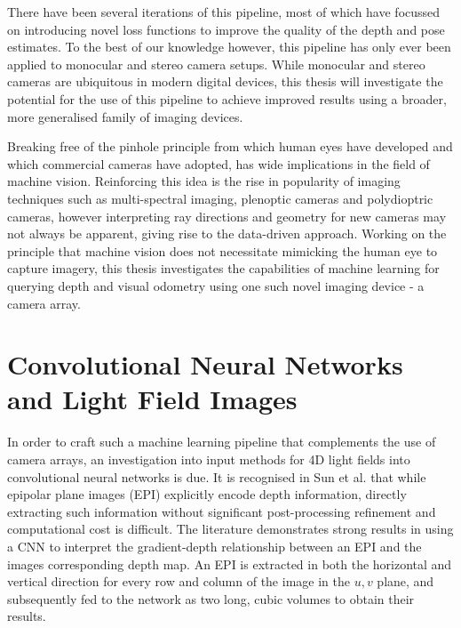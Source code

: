 \documentclass[openany]{book}
\begin{document}
There have been several iterations \cite{godard2016consistency, godard2018selfsupervised, zhan2018deepfeature} of this pipeline, most of which have focussed on introducing novel loss functions to improve the quality of the depth and pose estimates. To the best of our knowledge however, this pipeline has only ever been applied to monocular and stereo camera setups. While monocular and stereo cameras are ubiquitous in modern digital devices, this thesis will investigate the potential for the use of this pipeline to achieve improved results using a broader, more generalised family of imaging devices. 

Breaking free of the pinhole principle from which human eyes have developed and which commercial cameras have adopted, has wide implications in the field of machine vision. Reinforcing this idea is the rise in popularity of imaging techniques such as multi-spectral imaging, plenoptic cameras and polydioptric cameras, however interpreting ray directions and geometry for new cameras may not always be apparent, giving rise to the data-driven approach. Working on the principle that machine vision does not necessitate mimicking the human eye to capture imagery, this thesis investigates the capabilities of machine learning for querying depth and visual odometry using one such novel imaging device - a camera array.



\section{Convolutional Neural Networks and Light Field Images}

In order to craft such a machine learning pipeline that complements the use of camera arrays, an investigation into input methods for 4D light fields into convolutional neural networks is due. It is recognised in Sun et al. \cite{sun2016lfdepthcnn} that while epipolar plane images (EPI) explicitly encode depth information, directly extracting such information without significant post-processing refinement and computational cost is difficult. The literature demonstrates strong results in using a CNN to interpret the gradient-depth relationship between an EPI and the images corresponding depth map. An EPI is extracted in both the horizontal and vertical direction for every row and column of the image in the $u, v$ plane, and subsequently fed to the network as two long, cubic volumes to obtain their results.
\end{document}
